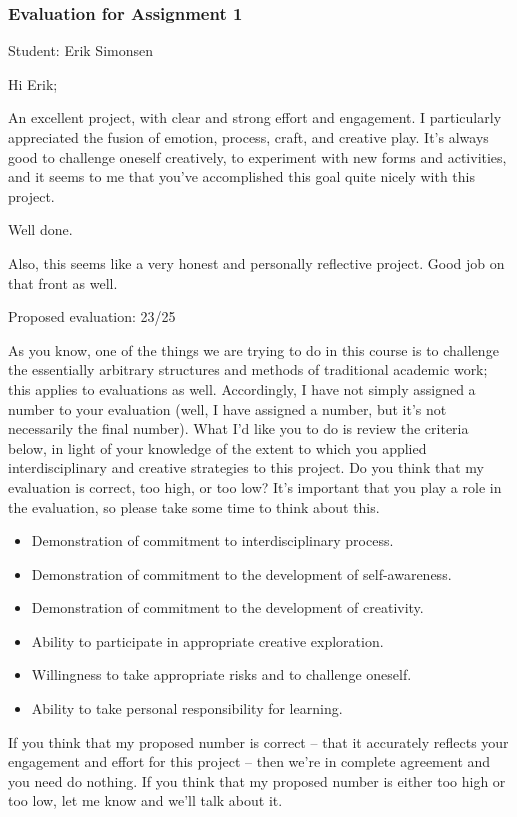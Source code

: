 \documentclass[letterpaper,10pt,DIV=9,headsepline]{scrreprt}
\begin{document}
\newpage

\subsubsection{Evaluation for Assignment 1}

Student: Erik Simonsen

\bigskip
Hi Erik;

An excellent project, with clear and strong effort and engagement. I
particularly appreciated the fusion of emotion, process, craft, and
creative play. It's always good to challenge oneself creatively, to
experiment with new forms and activities, and it seems to me that
you've accomplished this goal quite nicely with this project.

Well done.

Also, this seems like a very honest and personally reflective project. Good job on that front as well.

\bigskip
Proposed evaluation: 23/25

\bigskip
As you know, one of the things we are trying to do in this course is
to challenge the essentially arbitrary structures and methods of
traditional academic work; this applies to evaluations as well.
Accordingly, I have not simply assigned a number to your evaluation
(well, I have assigned a number, but it's not necessarily the final
number). What I'd like you to do is review the criteria below, in
light of your knowledge of the extent to which you applied
interdisciplinary and creative strategies to this project. Do you
think that my evaluation is correct, too high, or too low? It's
important that you play a role in the evaluation, so please take some
time to think about this.

\begin{itemize}
\item Demonstration of commitment to interdisciplinary process.
\item Demonstration of commitment to the development of self-awareness.
\item Demonstration of commitment to the development of creativity.
\item Ability to participate in appropriate creative exploration.
\item Willingness to take appropriate risks and to challenge oneself.
\item Ability to take personal responsibility for learning.
\end{itemize}

If you think that my proposed number is correct -- that it accurately
reflects your engagement and effort for this project -- then we're in
complete agreement and you need do nothing. If you think that my
proposed number is either too high or too low, let me know and we'll
talk about it.
\end{document}

